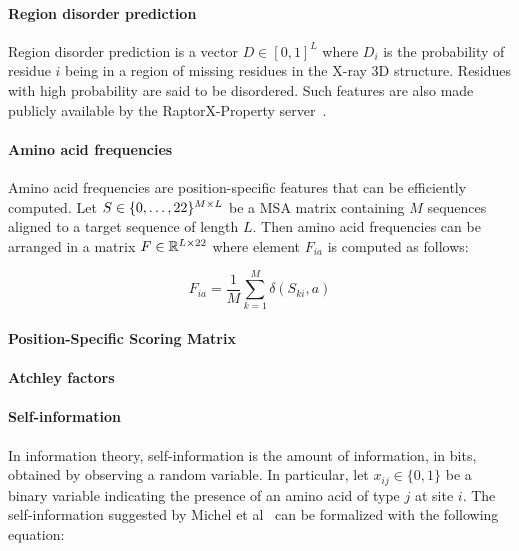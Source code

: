         \paragraph{Region disorder prediction}

            Region disorder prediction is a vector $D \in [0, 1]^L$
            where $D_i$ is the probability of residue $i$ being in a region
            of missing residues in the X-ray 3D structure. Residues with high
            probability are said to be disordered.
            Such features are also made publicly available by the 
            RaptorX-Property server~\cite{wang2016raptorx}.

        \paragraph{Amino acid frequencies}

            Amino acid frequencies are position-specific features that can be efficiently computed.
            Let $S \in \{0, \ldots, 22\}^{M \times L}$ be a
            MSA matrix containing $M$ sequences aligned to a target
            sequence of length $L$. Then amino acid frequencies can be arranged
            in a matrix $F \in \mathbb{R}^{L \times 22}$
            where element $F_{ia}$ is computed as follows:

            \begin{equation}
                F_{ia} = \frac{1}{M} \sum\limits_{k=1}^M \delta(S_{ki}, a)
            \end{equation}

        \paragraph{Position-Specific Scoring Matrix}


        \paragraph{Atchley factors}


        \paragraph{Self-information}

            In information theory, self-information is the amount of information, in bits,
            obtained by observing a random variable. In particular, let $x_{ij} \in \{0, 1\}$ be
            a binary variable indicating the presence of an amino acid of type $j$ at site $i$.
            The self-information suggested by Michel et al~\cite{Michel383133} can be formalized
            with the following equation:

